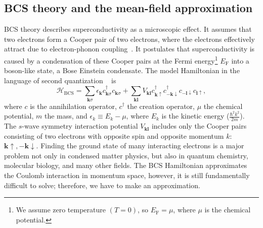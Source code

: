 \subsection{BCS theory and the mean-field approximation}\label{sec:BCS-theory}
BCS theory describes superconductivity as a microscopic effect.
It assumes that two electrons form a Cooper pair of two electrons, where the electrons effectively attract due to electron-phonon coupling~\cite{Cooper1956,Bardeen1957,Bardeen1957a}.
It postulates that superconductivity is caused by a condensation of these Cooper pairs at the Fermi energy\footnote{We assume zero temperature $\left(T=0\right)$, so $E_{\textrm{F}}=\mu$, where $\mu$ is the chemical potential.} $E_{\textrm{F}}$ into a boson-like state, a Bose Einstein condensate.
The model Hamiltonian in the language of second quantization ~\cite{Gennes1999} is
\begin{equation}
\mathcal{H}_{\textrm{BCS}}=\sum_{\bm{k}\sigma}\epsilon_{\bm{k}}c_{\bm{k}\sigma}^{\dagger}c_{\bm{k}\sigma}+\sum_{\bm{k}\bm{l}}V_{\bm{k}\bm{l}}c_{\bm{k}\uparrow}^{\dagger}c_{-\bm{k}\downarrow}^{\dagger}c_{-\bm{l}\downarrow}c_{\bm{l}\uparrow},\label{eq:BCS}
\end{equation}
where $c$ is the annihilation operator, $c^{\dagger}$ the creation operator, $\mu$ the chemical potential, $m$ the mass, and $\epsilon_{k} \equiv E_{k}-\mu$, where $E_{k}$ is the kinetic energy ($\frac{\hbar^{2}k^{2}}{2m}$).
The $s$-wave symmetry interaction potential $V_{\bm{kl}}$ includes only the Cooper pairs consisting of two electrons with opposite spin and opposite momentum $k$: $\bm{\bm{k}}\uparrow,-\bm{k}\downarrow$.
Finding the ground state of many interacting electrons is a major problem not only in condensed matter physics, but also in quantum chemistry, molecular biology, and many other fields.
The BCS Hamiltonian approximates the Coulomb interaction in momentum space, however, it is still fundamentally difficult to solve; therefore, we have to make an approximation.

